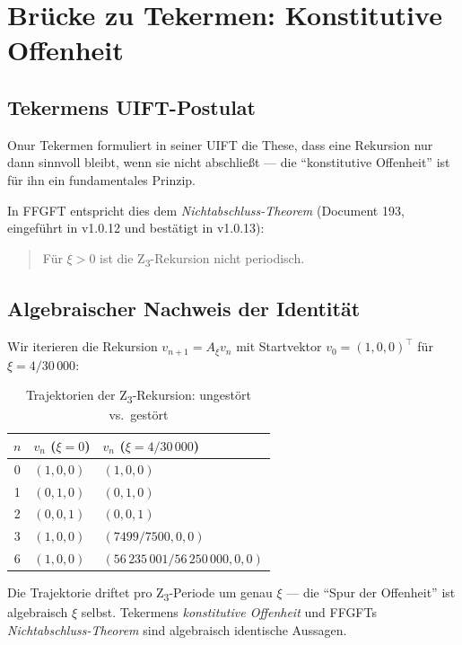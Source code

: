 \section{Brücke zu Tekermen: Konstitutive Offenheit}
\label{sec:tekermen}

\subsection{Tekermens UIFT-Postulat}

Onur Tekermen formuliert in seiner UIFT die These, dass eine Rekursion nur dann sinnvoll bleibt, wenn sie nicht abschließt — die ``konstitutive Offenheit'' ist für ihn ein fundamentales Prinzip.

In FFGFT entspricht dies dem \emph{Nichtabschluss-Theorem} (Document 193, eingeführt in v1.0.12 und bestätigt in v1.0.13):
\begin{quote}
Für \(\xi > 0\) ist die Z\textsubscript{3}-Rekursion nicht periodisch.
\end{quote}

\subsection{Algebraischer Nachweis der Identität}

Wir iterieren die Rekursion \(v_{n+1} = A_\xi v_n\) mit Startvektor \(v_0 = (1, 0, 0)^\top\) für \(\xi = 4/30\,000\):

\begin{table}[h]
\centering
\caption{Trajektorien der Z\textsubscript{3}-Rekursion: ungestört vs.~gestört}
\begin{tabular}{cll}
\toprule
\(n\) & \(v_n\) (\(\xi = 0\)) & \(v_n\) (\(\xi = 4/30\,000\)) \\
\midrule
0 & \((1, 0, 0)\) & \((1, 0, 0)\) \\
1 & \((0, 1, 0)\) & \((0, 1, 0)\) \\
2 & \((0, 0, 1)\) & \((0, 0, 1)\) \\
3 & \((1, 0, 0)\) & \((7499/7500, 0, 0)\) \\
6 & \((1, 0, 0)\) & \((56\,235\,001/56\,250\,000, 0, 0)\) \\
\bottomrule
\end{tabular}
\end{table}

\begin{keyresult}
Die Trajektorie driftet pro Z\textsubscript{3}-Periode um genau \(\xi\) — die ``Spur der Offenheit'' ist algebraisch \(\xi\) selbst. Tekermens \emph{konstitutive Offenheit} und FFGFTs \emph{Nichtabschluss-Theorem} sind algebraisch identische Aussagen.
\end{keyresult}

